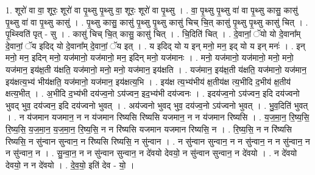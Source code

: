 \documentclass[17pt]{extarticle}
\begin{document}
1. शूरो॑ वा वा॒ शूरः॒ शूरो॑ वा पृ॒थ्सु पृ॒थ्सु वा॒ शूरः॒ शूरो॑ वा पृ॒थ्सु । . वा॒ पृ॒थ्सु पृ॒थ्सु वा॑ वा पृ॒थ्सु कासु॒ कासु॑ पृ॒थ्सु वा॑ वा पृ॒थ्सु कासु॑ । . पृ॒थ्सु कासु॒ कासु॑ पृ॒थ्सु पृ॒थ्सु कासु॑ चिच् चि॒त् कासु॑ पृ॒थ्सु पृ॒थ्सु कासु॑ चित् । . पृ॒थ्स्विति॑ पृत् - सु । . कासु॑ चिच् चि॒त् कासु॒ कासु॑ चित् । . चि॒दिति॑ चित् । . दे॒वानां॒ ॅयो यो दे॒वाना᳚म् दे॒वानां॒ ॅय इदिद् यो दे॒वाना᳚म् दे॒वानां॒ ॅय इत् । . य इदिद् यो य इन् मनो॒ मन॒ इद् यो य इन् मनः॑ । . इन् मनो॒ मन॒ इदिन् मनो॒ यज॑मानो॒ यज॑मानो॒ मन॒ इदिन् मनो॒ यज॑मानः । . मनो॒ यज॑मानो॒ यज॑मानो॒ मनो॒ मनो॒ यज॑मान॒ इय॑क्ष॒ती य॑क्षति॒ यज॑मानो॒ मनो॒ मनो॒ यज॑मान॒ इय॑क्षति । . यज॑मान॒ इय॑क्ष॒ती य॑क्षति॒ यज॑मानो॒ यज॑मान॒ इय॑क्षत्य॒भ्य॑ भीय॑क्षति॒ यज॑मानो॒ यज॑मान॒ इय॑क्षत्य॒भि । . इय॑क्ष त्य॒भ्य॑भीय॑ क्ष॒तीय॑क्ष त्य॒भीदि द॒भीय॑ क्ष॒तीय॑ क्षत्य॒भीत् । . अ॒भीदि द॒भ्य॑भी दय॑ज्व॒नो ऽय॑ज्वन॒ इद॒भ्य॑भी दय॑ज्वनः । . इदय॑ज्व॒नो ऽय॑ज्वन॒ इदि दय॑ज्वनो भुवद् भुव॒ दय॑ज्वन॒ इदि दय॑ज्वनो भुवत् । . अय॑ज्वनो भुवद् भुव॒ दय॑ज्व॒नो ऽय॑ज्वनो भुवत् । . भु॒व॒दिति॑ भुवत् । . न य॑जमान यजमान॒ न न य॑जमान रिष्यसि रिष्यसि यजमान॒ न न य॑जमान रिष्यसि । . य॒ज॒मा॒न॒ रि॒ष्य॒सि॒ रि॒ष्य॒सि॒ य॒ज॒मा॒न॒ य॒ज॒मा॒न॒ रि॒ष्य॒सि॒ न न रि॑ष्यसि यजमान यजमान रिष्यसि॒ न । . रि॒ष्य॒सि॒ न न रि॑ष्यसि रिष्यसि॒ न सु॑न्वान सुन्वान॒ न रि॑ष्यसि रिष्यसि॒ न सु॑न्वान । . न सु॑न्वान सुन्वान॒ न न सु॑न्वान॒ न न सु॑न्वान॒ न न सु॑न्वान॒ न । . सु॒न्वा॒न॒ न न सु॑न्वान सुन्वान॒ न दे॑वयो देवयो॒ न सु॑न्वान सुन्वान॒ न दे॑वयो । . न दे॑वयो देवयो॒ न न दे॑वयो । . दे॒व॒यो॒ इति॑ देव - यो॒ । \newline
\end{document}
